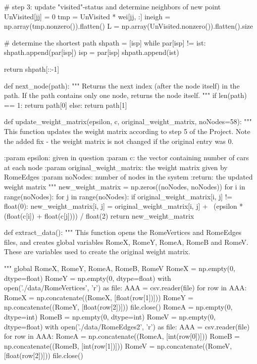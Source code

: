 \documentclass[paper=a4, fontsize=12pt]{scrartcl} %
\numberwithin{equation}{section}       %
\numberwithin{figure}{section}         %
\numberwithin{table}{section}          %
\begin{document}
\begin{python}
        # step 3: update "visited"-status and determine neighbors of new point
        UnVisited[jj] = 0
        tmp = UnVisited * wei[jj, :]
        ineigh = np.array(tmp.nonzero()).flatten()
        L = np.array(UnVisited.nonzero()).flatten().size

    # determine the shortest path
    shpath = [isp]
    while par[isp] != ist:
        shpath.append(par[isp])
        isp = par[isp]
    shpath.append(ist)

    return shpath[::-1]

def next_node(path):
    """ Returns the next index (after the node itself) in the path.
        If the path contains only one node, returns the node itself.
    """
    if len(path) == 1:
        return path[0]
    else:
        return path[1]


def update_weight_matrix(epsilon, c, original_weight_matrix, noNodes=58):
    """
    This function updates the weight matrix according to step 5 of the
    Project. Note the added fix - the weight matrix is not changed if
    the original entry was 0.



    :param epsilon: given in question
    :param c: the vector containing number of cars at each node
    :param original_weight_matrix: the weight matrix given by RomeEdges
    :param noNodes: number of nodes in the system
    :return: the updated weight matrix
    """
    new_weight_matrix = np.zeros((noNodes, noNodes))
    for i in range(noNodes):
        for j in range(noNodes):
            if original_weight_matrix[i, j] != float(0):
                new_weight_matrix[i, j] = original_weight_matrix[i, j] + \
                                          (epsilon * (float(c[i]) +
                                                      float(c[j]))) / float(2)
    return new_weight_matrix


def extract_data():
    """
    This function opens the RomeVertices and RomeEdges files, and creates
    global variables RomeX, RomeY, RomeA, RomeB and RomeV. These are variables
    used to create the original weight matrix.

    """
    global RomeX, RomeY, RomeA, RomeB, RomeV
    RomeX = np.empty(0, dtype=float)
    RomeY = np.empty(0, dtype=float)
    with open('./data/RomeVertices', 'r') as file:
        AAA = csv.reader(file)
        for row in AAA:
            RomeX = np.concatenate((RomeX, [float(row[1])]))
            RomeY = np.concatenate((RomeY, [float(row[2])]))
    file.close()
    RomeA = np.empty(0, dtype=int)
    RomeB = np.empty(0, dtype=int)
    RomeV = np.empty(0, dtype=float)
    with open('./data/RomeEdges2', 'r') as file:
        AAA = csv.reader(file)
        for row in AAA:
            RomeA = np.concatenate((RomeA, [int(row[0])]))
            RomeB = np.concatenate((RomeB, [int(row[1])]))
            RomeV = np.concatenate((RomeV, [float(row[2])]))
    file.close()
    

\end{python}
\end{document}
